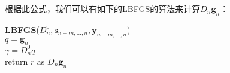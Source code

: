 根据此公式，我们可以有如下的LBFGS的算法来计算$D_n\mathbf{g}_n$：

\begin{minipage}{0.8\textwidth}\centering
\begin{algorithm}[H]
\textbf{LBFGS}($D_n^0, \mathbf{s}_{n-m,...,n}, \mathbf{y}_{n-m,...,n}$)\\
$q = \mathbf{g}_n$ \\ 
$\gamma = D_n^0q$\\
return $r$ as $D_n\mathbf{g}_n$\\
\end{algorithm}
\end{minipage}
